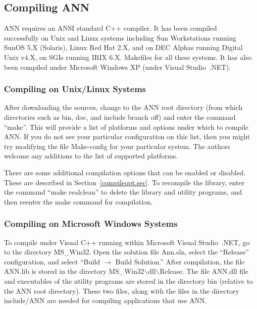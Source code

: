 \documentclass[11pt]{article}		%
\newcommand{\ANN}[0]{\textsf{ANN}}
\newcommand{\BSL}{\hbox{$\backslash$}}
\begin{document}
\subsection{Compiling {\ANN}}

{\ANN} requires an ANSI standard C++ compiler.  It has been compiled
successfully on Unix and Linux systems including Sun Workstations
running SunOS 5.X (Solaris), Linux Red Hat 2.X, and on DEC Alphas
running Digital Unix v4.X, on SGIs running IRIX 6.X.  Makefiles for all
these systems.  It has also been compiled under Microsoft Windows XP
(under Visual Studio~.NET).

\subsubsection{Compiling on Unix/Linux Systems}

After downloading the sources, change to the {\ANN} root directory (from
which directories such as \textsf{bin}, \textsf{doc}, and
\textsf{include} branch off) and enter the command ``\textsf{make}''.  This
will provide a list of platforms and options under which to compile
{\ANN}.  If you do not see your particular configuration on this list,
then you might try modifying the file \textsf{Make-config} for your
particular system.  The authors welcome any additions to the list of
supported platforms.

There are some additional compilation options that can be enabled or
disabled.  These are described in Section~\ref{compileopt.sec}.  To
recompile the library, enter the command ``\textsf{make realclean}'' to
delete the library and utility programs, and then reenter the make
command for compilation.

\subsubsection{Compiling on Microsoft Windows Systems}

To compile under Visual C++ running within Microsoft Visual Studio~.NET,
go to the directory \textsf{MS\_Win32}.  Open the solution file
\textsf{Ann.sln}, select the ``Release'' configuration, and select
``Build $\rightarrow$ Build Solution.''  After compilation, the file
\textsf{ANN.lib} is stored in the directory
\textsf{MS\_Win32{\BSL}dll{\BSL}Release}.  The file \textsf{ANN.dll}
file and executables of the utility programs are stored in the directory
\textsf{bin} (relative to the {\ANN} root directory).  These two files,
along with the files in the directory \textsf{include/ANN} are needed
for compiling applications that use {\ANN}.
\end{document}
